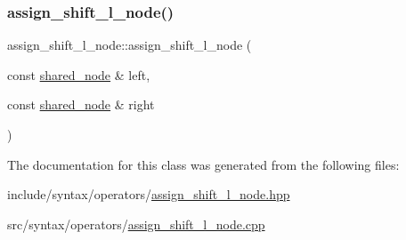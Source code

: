 \subsubsection{\texorpdfstring{assign\+\_\+shift\+\_\+l\+\_\+node()}{assign\_shift\_l\_node()}}
{\footnotesize\ttfamily assign\+\_\+shift\+\_\+l\+\_\+node\+::assign\+\_\+shift\+\_\+l\+\_\+node (\begin{DoxyParamCaption}\item[{const \hyperlink{namespacejawe_a3f307481d921b6cbb50cc8511fc2b544}{shared\+\_\+node} \&}]{left,  }\item[{const \hyperlink{namespacejawe_a3f307481d921b6cbb50cc8511fc2b544}{shared\+\_\+node} \&}]{right }\end{DoxyParamCaption})}



The documentation for this class was generated from the following files\+:\begin{DoxyCompactItemize}
\item 
include/syntax/operators/\hyperlink{assign__shift__l__node_8hpp}{assign\+\_\+shift\+\_\+l\+\_\+node.\+hpp}\item 
src/syntax/operators/\hyperlink{assign__shift__l__node_8cpp}{assign\+\_\+shift\+\_\+l\+\_\+node.\+cpp}\end{DoxyCompactItemize}
